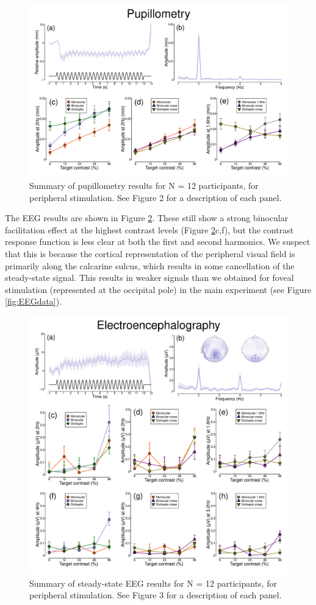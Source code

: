 \documentclass[
]{article}
\begin{document}
\begin{figure}

{\centering \includegraphics{Figures/pupildataRep} 

}

\caption{Summary of pupillometry results for N = 12 participants, for peripheral stimulation. See Figure 2 for a description of each panel.}\label{fig:appendixfig1}
\end{figure}

The EEG results are shown in Figure \ref{fig:appendixfig2}. These still show a strong binocular facilitation effect at the highest contrast levels (Figure \ref{fig:appendixfig2}c,f), but the contrast response function is less clear at both the first and second harmonics. We suspect that this is because the cortical representation of the peripheral visual field is primarily along the calcarine sulcus, which results in some cancellation of the steady-state signal. This results in weaker signals than we obtained for foveal stimulation (represented at the occipital pole) in the main experiment (see Figure \ref{fig:EEGdata}).

\begin{figure}

{\centering \includegraphics{Figures/EEGdataRep} 

}

\caption{Summary of steady-state EEG results for N = 12 participants, for peripheral stimulation. See Figure 3 for a description of each panel.}\label{fig:appendixfig2}
\end{figure}
\end{document}
